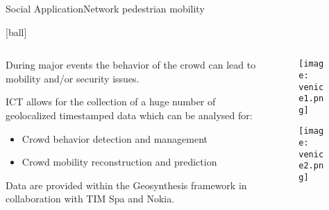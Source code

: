 \documentclass{standalone}
\begin{document}
\begin{frame}{Social Application}{Network pedestrian mobility}

  [ball]

  \begin{columns}
    \begin{column}{0.6\linewidth}

      During major events the behavior of the crowd can lead to mobility and/or security issues.

      ICT allows for the collection of a huge number of geolocalized timestamped data which can be analysed for:

      \vspace{0.5cm}

      \begin{itemize}

        \item Crowd behavior detection and management
        \item Crowd mobility reconstruction and prediction

      \end{itemize}

      Data are provided within the Geosynthesis framework in collaboration with TIM Spa and Nokia.

    \end{column}

    \begin{column}{0.4\linewidth}
      \begin{figure}
        \centering
        \texttt{[image: venice1.png]}
      \end{figure}
      \begin{figure}
        \centering
        \texttt{[image: venice2.png]}
      \end{figure}

    \end{column}

  \end{columns}

\end{frame}
\end{document}
